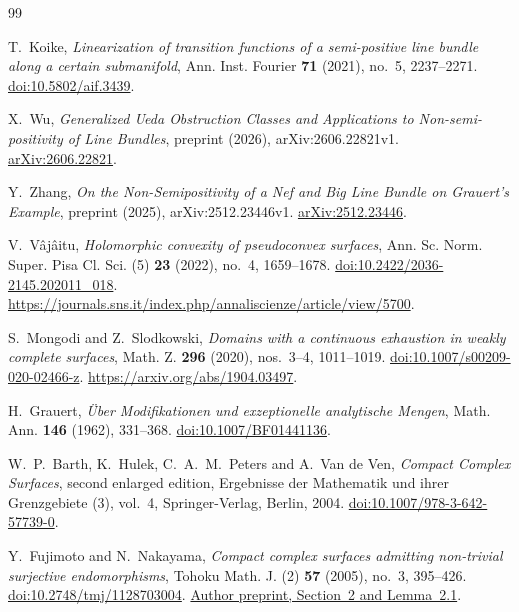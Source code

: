 \documentclass[11pt]{amsart}
\theoremstyle{definition}
\theoremstyle{remark}
\numberwithin{equation}{section}
\begin{document}
\begin{thebibliography}{99}
\raggedright

T.~Koike,
\emph{Linearization of transition functions of a semi-positive line
bundle along a certain submanifold},
Ann. Inst. Fourier \textbf{71} (2021), no.~5, 2237--2271.
\href{https://doi.org/10.5802/aif.3439}{doi:10.5802/aif.3439}.

X.~Wu,
\emph{Generalized Ueda Obstruction Classes and Applications to
Non-semi-positivity of Line Bundles},
preprint (2026), arXiv:2606.22821v1.
\href{https://arxiv.org/abs/2606.22821v1}{arXiv:2606.22821}.

Y.~Zhang,
\emph{On the Non-Semipositivity of a Nef and Big Line Bundle on
Grauert's Example},
preprint (2025), arXiv:2512.23446v1.
\href{https://arxiv.org/abs/2512.23446v1}{arXiv:2512.23446}.

V.~V\^aj\^aitu,
\emph{Holomorphic convexity of pseudoconvex surfaces},
Ann. Sc. Norm. Super. Pisa Cl. Sci. (5) \textbf{23} (2022),
no.~4, 1659--1678.
\href{https://doi.org/10.2422/2036-2145.202011_018}{doi:10.2422/2036-2145.202011\_018}.
\url{https://journals.sns.it/index.php/annaliscienze/article/view/5700}.

S.~Mongodi and Z.~Slodkowski,
\emph{Domains with a continuous exhaustion in weakly complete surfaces},
Math. Z. \textbf{296} (2020), nos.~3--4, 1011--1019.
\href{https://doi.org/10.1007/s00209-020-02466-z}{doi:10.1007/s00209-020-02466-z}.
\url{https://arxiv.org/abs/1904.03497}.

H.~Grauert,
\emph{\"Uber Modifikationen und exzeptionelle analytische Mengen},
Math. Ann. \textbf{146} (1962), 331--368.
\href{https://doi.org/10.1007/BF01441136}{doi:10.1007/BF01441136}.

W.~P.~Barth, K.~Hulek, C.~A.~M.~Peters and A.~Van de Ven,
\emph{Compact Complex Surfaces}, second enlarged edition,
Ergebnisse der Mathematik und ihrer Grenzgebiete (3), vol.~4,
Springer-Verlag, Berlin, 2004.
\href{https://doi.org/10.1007/978-3-642-57739-0}{doi:10.1007/978-3-642-57739-0}.

Y.~Fujimoto and N.~Nakayama,
\emph{Compact complex surfaces admitting non-trivial surjective endomorphisms},
Tohoku Math. J. (2) \textbf{57} (2005), no.~3, 395--426.
\href{https://doi.org/10.2748/tmj/1128703004}{doi:10.2748/tmj/1128703004}.
\href{https://www.kurims.kyoto-u.ac.jp/preprint/file/RIMS1431.pdf}{Author preprint, Section~2 and Lemma~2.1}.


\end{thebibliography}
\end{document}
